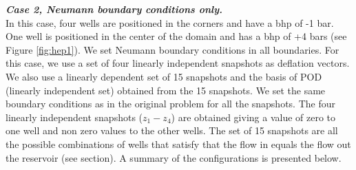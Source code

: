 \documentclass[12pt]{article}
\begin{document}
\textbf{\emph{Case 2, Neumann boundary conditions only.}}\\
In this case, four wells are positioned in the corners and have a bhp of -1 bar. One well
is positioned in the center of the domain and has a bhp of +4 bars
(see Figure \ref{fig:hep1}). We set Neumann boundary conditions in all boundaries. For this case, we use a set of four linearly independent snapshots as deflation vectors. We also use a linearly dependent set of 15 snapshots and the basis of POD (linearly independent set) obtained from the 15 snapshots. We set the same boundary conditions as in the original problem for all the snapshots.
The four linearly independent snapshots ($z_1-z_4$) are obtained giving a value of zero to one well and non 
zero values to the other wells. The set of 15 snapshots are all the possible combinations of wells that satisfy that the flow in equals the flow out the reservoir (see section).
A summary of the configurations is presented below.
\newpage
\end{document}
